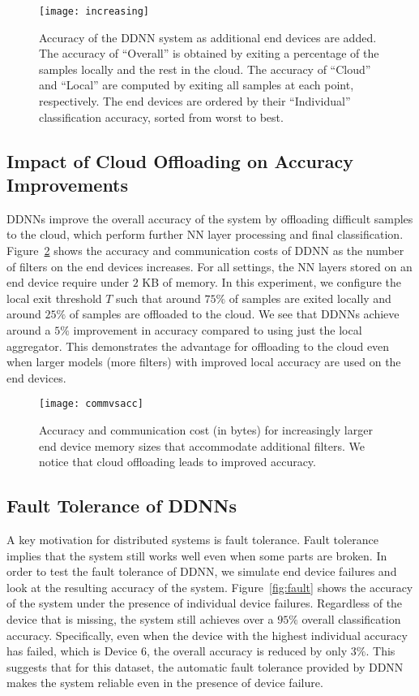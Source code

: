 \documentclass[10pt, conference, compsocconf]{IEEEtran}
\begin{document}
\begin{figure}
    \centering
    \texttt{[image: increasing]}
    \caption{Accuracy of the DDNN system as additional end devices are added. The accuracy of ``Overall'' is obtained by exiting a percentage of the samples locally and the rest in the cloud. The accuracy of ``Cloud'' and ``Local'' are computed by exiting all samples at each point, respectively. The end devices are ordered by their ``Individual'' classification accuracy, sorted from worst to best.}
    \label{fig:increasing}
\end{figure}





\subsection{Impact of Cloud Offloading on Accuracy Improvements}
DDNNs improve the overall accuracy of the system by offloading difficult samples to the cloud, which perform further NN layer processing and final classification.  Figure~\ref{fig:commvsacc} shows the accuracy and communication costs of DDNN as the number of filters on the end devices increases. For all settings, the NN layers stored on an end device require under $2$ KB of memory. In this experiment, we configure the local exit threshold $T$ such that around $75\%$ of samples are exited locally and around $25\%$ of samples are offloaded to the cloud. We see that DDNNs achieve around a $5\%$ improvement in accuracy compared to using just the local aggregator. This demonstrates the advantage for offloading to the cloud even when larger models (more filters) with improved local accuracy are used on the end devices.

\begin{figure}
    \centering
    \texttt{[image: commvsacc]}
    \caption{Accuracy and communication cost (in bytes) for increasingly larger end device memory sizes that accommodate additional filters. We notice that cloud offloading leads to improved accuracy.}
    \label{fig:commvsacc}
\end{figure}




\subsection{Fault Tolerance of DDNNs}
A key motivation for distributed systems is fault tolerance. Fault tolerance implies that the system still works well even when some parts are broken. In order to test the fault tolerance of DDNN, we simulate end device failures and look at the resulting accuracy of the system. Figure~\ref{fig:fault} shows the accuracy of the system under the presence of individual device failures. Regardless of the device that is missing, the system still achieves over a $95\%$ overall classification accuracy. Specifically, even when the device with the highest individual accuracy has failed, which is Device 6, the overall accuracy is reduced by only $3\%$. This suggests that for this dataset, the automatic fault tolerance provided by DDNN makes the system reliable even in the presence of device failure.
\end{document}
